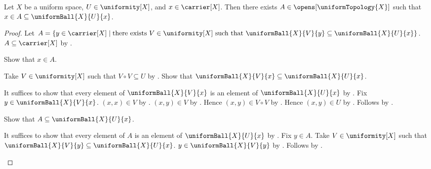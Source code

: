 \begin{theorem}\label{uniform_ball_contains_open_neighbourhood}
    Let $X$ be a uniform space, $U\in\uniformity[X]$, and
        $x\in\carrier[X]$.
    Then there exists $A\in\opens[\uniformTopology{X}]$ such that
        $x\in A\subseteq\uniformBall{X}{U}{x}$.
\end{theorem}
\begin{proof}
    Let $A=\{y\in\carrier[X]\mid
        \text{there exists $V\in\uniformity[X]$ such that
            $\uniformBall{X}{V}{y}\subseteq\uniformBall{X}{U}{x}$}\}$.
    $A\subseteq\carrier[X]$ by .

    Show that $x\in A$.
    \begin{subproof}
        Take $V\in\uniformity[X]$ such that $V\circ V\subseteq U$
            by .
        Show that $\uniformBall{X}{V}{x}\subseteq\uniformBall{X}{U}{x}$.
        \begin{subproof}
            It suffices to show that every element of
                $\uniformBall{X}{V}{x}$ is an element of
                $\uniformBall{X}{U}{x}$ by .
            Fix $y\in\uniformBall{X}{V}{x}$.
            $(x,x)\in V$ by .
            $(x,y)\in V$ by .
            Hence $(x,y)\in V\circ V$ by .
            Hence $(x,y)\in U$ by .
            Follows by .
        \end{subproof}
    \end{subproof}

    Show that $A\subseteq\uniformBall{X}{U}{x}$.
    \begin{subproof}
        It suffices to show that every element of $A$ is an element of
            $\uniformBall{X}{U}{x}$ by .
        Fix $y\in A$.
        Take $V\in\uniformity[X]$ such that
            $\uniformBall{X}{V}{y}\subseteq\uniformBall{X}{U}{x}$.
        $y\in\uniformBall{X}{V}{y}$
            by .
        Follows by .
    \end{subproof}


\end{proof}
